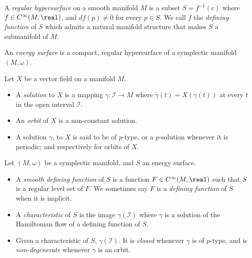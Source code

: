 \documentclass[../main-v2-manifolds.tex]{subfiles}
\begin{document}
\begin{definition}\label{def:regular hypersurface}
    A \emph{regular hypersurface} on a smooth manifold $M$ is a subset $S = f^{-1}(c)$ where $f\in C^\infty(M,\real)$, and $df(p)\neq 0$ for every $p\in S$. We call $f$ the \emph{defining function} of $S$ which admits a natural manifold structure that makes $S$ a submanifold of $M$. 
\end{definition}
\begin{definition}\label{def:energy surface}
    An \emph{energy surface} is a compact, regular hypersurface of a symplectic manifold $(M,\omega)$.
\end{definition}
\begin{remark}
    Let $X$ be a vector field on a manifold $M$.
\begin{itemize}
    \item A \emph{solution} to $X$ is a mapping $\gamma: \mathcal{I}\to M$ where $\mathring{\gamma}(t) = X(\gamma(t))$ at every $t$ in the open interval $\mathcal{I}$.
    \item An \emph{orbit} of $X$ is a non-constant solution.
    \item A solution $\gamma$, to $X$ is said to be of $p$-type, or a $p$-solution whenever it is periodic; and respectively for orbits of $X$.
\end{itemize}
Let $(M,\omega)$ be a symplectic manifold, and $S$ an energy surface.
\begin{itemize}
    \item A \emph{smooth defining function} of $S$ is a function $F\in C^\infty(M,\real)$ such that $S$ is a regular level set of $F$. We sometimes say $F$ is a \emph{defining function} of $S$ when it is implicit.
    \item A \emph{characteristic} of $S$ is the image $\gamma(\mathcal{I})$ where $\gamma$ is a solution of the Hamiltonian flow of a defining function of $S$. 
    \item Given a characteristic of $S$, $\gamma(\mathcal{I})$. It is \emph{closed} whenever $\gamma$ is of $p$-type, and is \emph{non-degenerate} whenever $\gamma$ is an orbit.
\end{itemize}

\end{remark}
\end{document}

